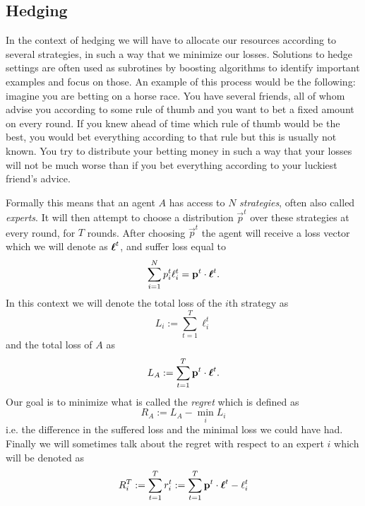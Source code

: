\subsection{Hedging}
\label{subsec:hedging}
In the context of hedging we will have to allocate our resources according to several strategies, in such a way that we minimize our losses. Solutions to hedge settings are often used as subrotines by boosting algorithms to identify important examples and focus on those. An example of this process would be the following: imagine you are betting on a horse race. You have several friends, all of whom advise you according to some rule of thumb and you want to bet a fixed amount on every round. If you knew ahead of time which rule of thumb would be the best, you would bet everything according to that rule but this is usually not known. You try to distribute your betting money in such a way that your losses will not be much worse than if you bet everything according to your luckiest friend's advice.  
\par Formally this means that an agent $A$ has access to $N$ \textit{strategies}, often also called \textit{experts}. It will then attempt to choose a distribution $\vec p^t$ over these strategies at every round, for $T$ rounds. After choosing $\vec p^t$ the agent will receive a loss vector which we will denote as $\boldsymbol\ell^t$, and suffer loss equal to $$\sum_{i=1}^N p^t_i\ell_i^t = \mathbf{p}^t \cdot \boldsymbol\ell^t.$$ In this context we will denote the total loss of the $i$th strategy as $$L_i:= \sum_{t=1}^T \ell^t_i$$ and the total loss of $A$ as $$L_A := \sum_{t=1}^T \mathbf{p}^t \cdot \boldsymbol\ell^t.$$ Our goal is to minimize what is called the \textit{regret} which is defined as $$R_A:=L_A - \min_i L_i$$ i.e. the difference in the suffered loss and the minimal loss we could have had. Finally we will sometimes talk about the regret with respect to an expert $i$ which will be denoted as $$R^T_i := \sum^T_{t=1}r_i^t := \sum^T_{t=1} \mathbf{p}^t \cdot \boldsymbol\ell^t -\ell_i^t$$

